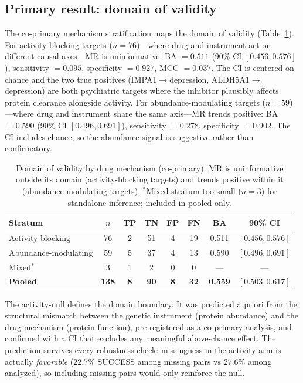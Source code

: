 \documentclass[11pt]{article}
\begin{document}
\subsection{Primary result: domain of validity}
\label{sec:boundary}

The co-primary mechanism stratification maps the domain of validity (Table~\ref{tab:mechanism}). For activity-blocking targets ($n = 76$)---where drug and instrument act on different causal axes---MR is uninformative: BA $= 0.511$ (90\% CI $[0.456, 0.576]$), sensitivity $= 0.095$, specificity $= 0.927$, MCC $= 0.037$. The CI is centered on chance and the two true positives (IMPA1$\rightarrow$depression, ALDH5A1$\rightarrow$depression) are both psychiatric targets where the inhibitor plausibly affects protein clearance alongside activity. For abundance-modulating targets ($n = 59$)---where drug and instrument share the same axis---MR trends positive: BA $= 0.590$ (90\% CI $[0.496, 0.691]$), sensitivity $= 0.278$, specificity $= 0.902$. The CI includes chance, so the abundance signal is suggestive rather than confirmatory.

\vspace{1em}
\begin{table}[t]
\centering
\caption{Domain of validity by drug mechanism (co-primary). MR is uninformative outside its domain (activity-blocking targets) and trends positive within it (abundance-modulating targets). $^{*}$Mixed stratum too small ($n = 3$) for standalone inference; included in pooled only.}
\label{tab:mechanism}
\begin{tabular}{lccccccc}
\toprule
Stratum & $n$ & TP & TN & FP & FN & BA & 90\% CI \\
\midrule
Activity-blocking & 76 & 2 & 51 & 4 & 19 & 0.511 & $[0.456, 0.576]$ \\
Abundance-modulating & 59 & 5 & 37 & 4 & 13 & 0.590 & $[0.496, 0.691]$ \\
Mixed$^{*}$ & 3 & 1 & 2 & 0 & 0 & --- & --- \\
\midrule
\textbf{Pooled} & \textbf{138} & \textbf{8} & \textbf{90} & \textbf{8} & \textbf{32} & \textbf{0.559} & $[0.503, 0.617]$ \\
\bottomrule
\end{tabular}
\end{table}

The activity-null defines the domain boundary. It was predicted a priori from the structural mismatch between the genetic instrument (protein abundance) and the drug mechanism (protein function), pre-registered as a co-primary analysis, and confirmed with a CI that excludes any meaningful above-chance effect. The prediction survives every robustness check: missingness in the activity arm is actually \emph{favorable} (22.7\% SUCCESS among missing pairs vs 27.6\% among analyzed), so including missing pairs would only reinforce the null.
\end{document}
